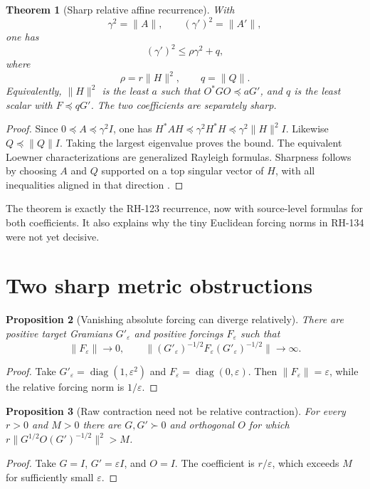 \documentclass[12pt]{article}
\newtheorem{theorem}{Theorem}
\newtheorem{proposition}[theorem]{Proposition}
\begin{document}
\begin{theorem}[Sharp relative affine recurrence]\label{thm:relative}
With
\[
 \gamma^2=\|A\|,\qquad (\gamma')^2=\|A'\|,
\]
one has
\[
 (\gamma')^2\leq\rho\gamma^2+q,
\]
where
\[
 \rho=r\|H\|^2,
 \qquad q=\|Q\|.
\]
Equivalently, $\|H\|^2$ is the least $a$ such that
$O^*GO\preceq aG'$, and $q$ is the least scalar with $F\preceq qG'$.
The two coefficients are separately sharp.
\end{theorem}

\begin{proof}
Since $0\preceq A\preceq\gamma^2I$, one has
$H^*AH\preceq\gamma^2H^*H\preceq\gamma^2\|H\|^2I$.
Likewise $Q\preceq\|Q\|I$.  Taking the largest eigenvalue proves the bound.
The equivalent Loewner characterizations are generalized Rayleigh formulas.
Sharpness follows by choosing $A$ and $Q$ supported on a top singular vector
of $H$, with all inequalities aligned in that direction
\citep{HornJohnson1991,Bhatia1997}.
\end{proof}

The theorem is exactly the RH-123 recurrence, now with source-level formulas
for both coefficients.  It also explains why the tiny Euclidean forcing
norms in RH-134 were not yet decisive.

\section{Two sharp metric obstructions}
\begin{proposition}[Vanishing absolute forcing can diverge relatively]\label{prop:forcing}
There are positive target Gramians $G'_\varepsilon$ and positive forcings
$F_\varepsilon$ such that
\[
 \|F_\varepsilon\|\longrightarrow0,
 \qquad
 \|(G'_\varepsilon)^{-1/2}F_\varepsilon
 (G'_\varepsilon)^{-1/2}\|\longrightarrow\infty.
\]
\end{proposition}
\begin{proof}
Take
$G'_\varepsilon=\operatorname{diag}(1,\varepsilon^2)$ and
$F_\varepsilon=\operatorname{diag}(0,\varepsilon)$.  Then
$\|F_\varepsilon\|=\varepsilon$, while the relative forcing norm is
$1/\varepsilon$.
\end{proof}

\begin{proposition}[Raw contraction need not be relative contraction]\label{prop:metric}
For every $r>0$ and $M>0$ there are $G,G'\succ0$ and orthogonal $O$ for
which $r\|G^{1/2}O(G')^{-1/2}\|^2>M$.
\end{proposition}
\begin{proof}
Take $G=I$, $G'=\varepsilon I$, and $O=I$.  The coefficient is
$r/\varepsilon$, which exceeds $M$ for sufficiently small $\varepsilon$.
\end{proof}
\end{document}

